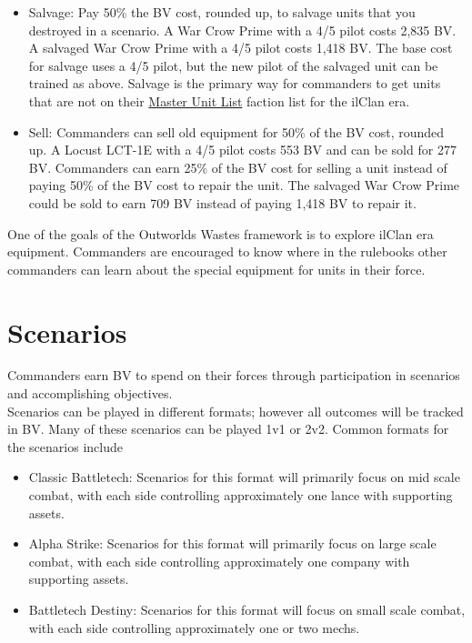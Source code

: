 \documentclass[UTF8]{article}
\begin{document}
\begin{itemize}
\item Salvage: Pay 50\% the BV cost, rounded up, to salvage units that you destroyed in a scenario.
A War Crow Prime with a 4/5 pilot costs 2,835 BV.
A salvaged War Crow Prime with a 4/5 pilot costs 1,418 BV.
The base cost for salvage uses a 4/5 pilot, but the new pilot of the salvaged unit can be trained as above.
Salvage is the primary way for commanders to get units that are not on their \href{http://www.masterunitlist.info/}{Master Unit List} faction list for the ilClan era.

\item Sell: Commanders can sell old equipment for 50\% of the BV cost, rounded up.
A Locust LCT-1E with a 4/5 pilot costs 553 BV and can be sold for 277 BV.
Commanders can earn 25\% of the BV cost for selling a unit instead of paying 50\% of the BV cost to repair the unit.
The salvaged War Crow Prime could be sold to earn 709 BV instead of paying 1,418 BV to repair it.

\end{itemize}

One of the goals of the Outworlds Wastes framework is to explore ilClan era equipment.
Commanders are encouraged to know where in the rulebooks other commanders can learn about the special equipment for units in their force.

\newpage

\section{Scenarios}

Commanders earn BV to spend on their forces through participation in scenarios and accomplishing objectives.\\

Scenarios can be played in different formats; however all outcomes will be tracked in BV.
Many of these scenarios can be played 1v1 or 2v2.
Common formats for the scenarios include

\begin{itemize}

\item Classic Battletech: Scenarios for this format will primarily focus on mid scale combat, with each side controlling approximately one lance with supporting assets.

\item Alpha Strike: Scenarios for this format will primarily focus on large scale combat, with each side controlling approximately one company with supporting assets.

\item Battletech Destiny: Scenarios for this format will focus on small scale combat, with each side controlling approximately one or two mechs.

\end{itemize}
\end{document}
